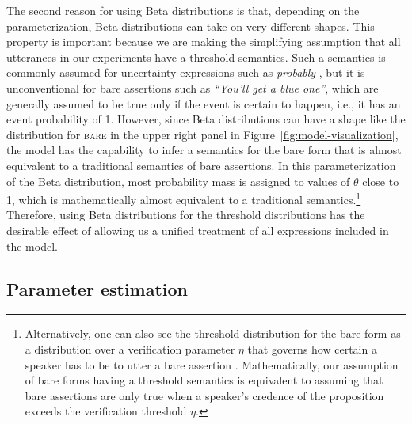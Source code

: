 The second reason for using Beta distributions is that, depending on the parameterization, 
Beta distributions can take on very different shapes. This property is important because we are making
the simplifying assumption that all utterances in our experiments have a threshold semantics.
Such a semantics is commonly assumed for uncertainty expressions such as \textit{probably} \cite[e.g.,][]{Yalcin2010,Lassiter2016}, 
but it is unconventional for bare assertions such as \textit{``You'll get a blue one''}, which are generally assumed to be  
true only if the event is certain to happen, i.e., it has an event probability of 1. However, since Beta distributions can have a shape 
like the distribution for \textsc{bare} in the upper right panel in Figure~\ref{fig:model-visualization}, the model has the capability to infer
a semantics for the bare form that is almost equivalent to a traditional semantics of bare assertions. In this parameterization of the
Beta distribution, most probability mass is assigned to values of $\theta$ close to 1, which is mathematically almost equivalent to
a traditional semantics.\footnote{Alternatively, one can also see the threshold distribution for the bare form as a distribution over a verification parameter $\eta$ that governs 
how certain a speaker has to be to utter a bare assertion \cite[see, e.g.,][]{Lewis1976,Potts2007,Davis2007,Moss2018}. Mathematically, our assumption of bare forms having a threshold
semantics is equivalent to assuming that bare assertions are only true when a speaker's credence of the proposition exceeds the verification threshold $\eta$.}
Therefore, using Beta distributions for the threshold distributions has the desirable effect of allowing us a unified treatment of all expressions included in the model. 

\subsection{Parameter estimation}

